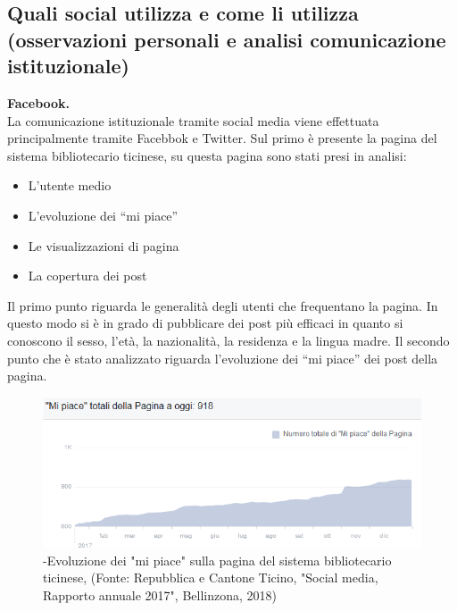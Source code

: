 \subsection{Quali social utilizza e come li utilizza (osservazioni personali e analisi comunicazione istituzionale)}
\textbf{Facebook.}\\
La comunicazione istituzionale tramite social media viene effettuata principalmente tramite Facebbok e Twitter. Sul primo è presente la pagina del sistema bibliotecario ticinese, su questa pagina sono stati presi in analisi: 
\begin{itemize}
    \item L’utente medio
    \item L’evoluzione dei “mi piace”
    \item Le visualizzazioni di pagina
    \item La copertura dei post
\end{itemize}
Il primo punto riguarda le generalità degli utenti che frequentano la pagina. In questo modo si è in grado di pubblicare dei post più efficaci in quanto si conoscono il sesso, l’età, la nazionalità, la residenza e la lingua madre. Il secondo punto che è stato analizzato riguarda l’evoluzione dei “mi piace” dei post della pagina.
\begin{figure}[h]
        \includegraphics[width=\textwidth]{capitoli/foto/like.png}
        \caption {-Evoluzione dei "mi piace" sulla pagina del sistema bibliotecario ticinese, (Fonte: Repubblica e Cantone Ticino, "Social media, Rapporto annuale 2017", Bellinzona, 2018)}
        \label{fig:my_label}
\end{figure}

